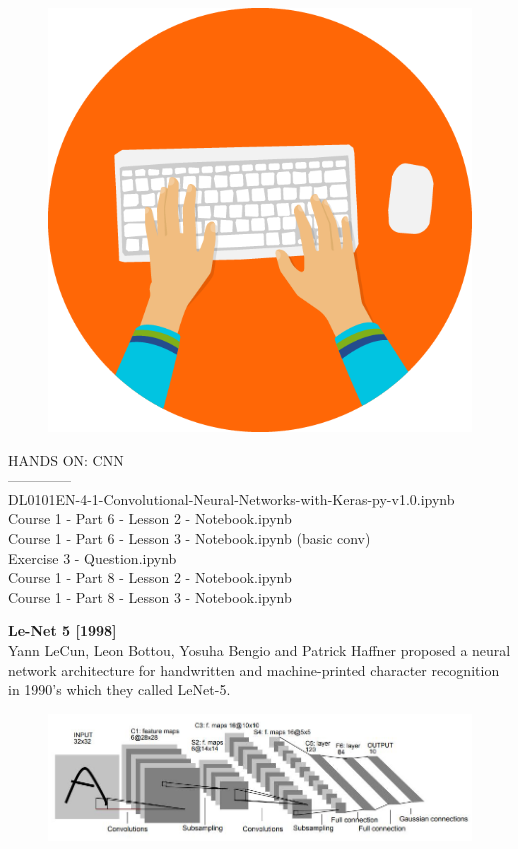 \documentclass[10pt, compress]{beamer}
\begin{document}
\begin{frame}
  \vspace{.5cm}
  \begin{figure}
    \includegraphics[width=.2\linewidth, left]{imgs/hands_on_1}
  \end{figure}
  HANDS ON: CNN \\
  -------------- \\
  DL0101EN-4-1-Convolutional-Neural-Networks-with-Keras-py-v1.0.ipynb \\
  Course 1 - Part 6 - Lesson 2 - Notebook.ipynb \\
  Course 1 - Part 6 - Lesson 3 - Notebook.ipynb (basic conv) \\

  Exercise 3 - Question.ipynb \\
  Course 1 - Part 8 - Lesson 2 - Notebook.ipynb \\
  Course 1 - Part 8 - Lesson 3 - Notebook.ipynb \\
\end{frame}

\begin{frame}
  \vspace{0.6cm}
  \textbf{Le-Net 5 [1998]} \\
  Yann LeCun, Leon Bottou, Yosuha Bengio and Patrick Haffner proposed a neural network architecture for handwritten and machine-printed character recognition in 1990’s which they called LeNet-5.
  \begin{figure}
    \includegraphics[width=.9\linewidth]{imgs/cnn/lenet}
  \end{figure}
\end{frame}
\end{document}
